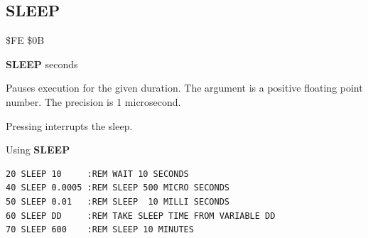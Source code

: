 
\newpage
\subsection{SLEEP}
\begin{description}[leftmargin=2cm,style=nextline]
\item [Token:] \$FE \$0B
\item [Format:] {\bf SLEEP} seconds
\item [Usage:] Pauses execution for the given duration. The argument is a
               positive floating point number.
               The precision is 1 microsecond.
\item [Remarks:] Pressing  interrupts the sleep.

\item [Example:] Using {\bf SLEEP}
\begin{tcolorbox}[colback=black,coltext=white]
\verbatimfont{\codefont}
\begin{verbatim}
20 SLEEP 10     :REM WAIT 10 SECONDS
40 SLEEP 0.0005 :REM SLEEP 500 MICRO SECONDS
50 SLEEP 0.01   :REM SLEEP  10 MILLI SECONDS
60 SLEEP DD     :REM TAKE SLEEP TIME FROM VARIABLE DD
70 SLEEP 600    :REM SLEEP 10 MINUTES
\end{verbatim}
\end{tcolorbox}
\end{description}


\newpage
